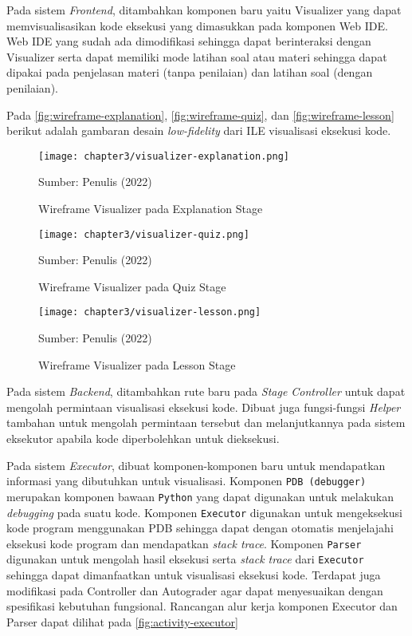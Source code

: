 Pada sistem \textit{Frontend}, ditambahkan komponen baru yaitu Visualizer yang dapat memvisualisasikan kode eksekusi yang dimasukkan pada komponen Web IDE. Web IDE yang sudah ada dimodifikasi sehingga dapat berinteraksi dengan Visualizer serta dapat memiliki mode latihan soal atau materi sehingga dapat dipakai pada penjelasan materi (tanpa penilaian) dan latihan soal (dengan penilaian).

Pada \autoref{fig:wireframe-explanation}, \autoref{fig:wireframe-quiz}, dan \autoref{fig:wireframe-lesson} berikut adalah gambaran desain \textit{low-fidelity} dari ILE visualisasi eksekusi kode.

\begin{figure}[H]
  \centering
  \texttt{[image: chapter3/visualizer-explanation.png]}
  \caption{Wireframe Visualizer pada Explanation Stage} \label{fig:wireframe-explanation}
  Sumber: Penulis (2022)
\end{figure}

\begin{figure}[H]
  \centering
  \texttt{[image: chapter3/visualizer-quiz.png]}
  \caption{Wireframe Visualizer pada Quiz Stage} \label{fig:wireframe-quiz}
  Sumber: Penulis (2022)
\end{figure}

\begin{figure}[H]
  \centering
  \texttt{[image: chapter3/visualizer-lesson.png]}
  \caption{Wireframe Visualizer pada Lesson Stage} \label{fig:wireframe-lesson}
  Sumber: Penulis (2022)
\end{figure}

Pada sistem \textit{Backend}, ditambahkan rute baru pada \textit{Stage Controller} untuk dapat mengolah permintaan visualisasi eksekusi kode. Dibuat juga fungsi-fungsi \textit{Helper} tambahan untuk mengolah permintaan tersebut dan melanjutkannya pada sistem eksekutor apabila kode diperbolehkan untuk dieksekusi.

Pada sistem \textit{Executor}, dibuat komponen-komponen baru untuk mendapatkan informasi yang dibutuhkan untuk visualisasi. Komponen \verb|PDB (debugger)| merupakan komponen bawaan \verb|Python| yang dapat digunakan untuk melakukan \textit{debugging} pada suatu kode. Komponen \verb|Executor| digunakan untuk mengeksekusi kode program menggunakan PDB sehingga dapat dengan otomatis menjelajahi eksekusi kode program dan mendapatkan \textit{stack trace}. Komponen \verb|Parser| digunakan untuk mengolah hasil eksekusi serta \textit{stack trace} dari \verb|Executor| sehingga dapat dimanfaatkan untuk visualisasi eksekusi kode. Terdapat juga modifikasi pada Controller dan Autograder agar dapat menyesuaikan dengan spesifikasi kebutuhan fungsional. Rancangan alur kerja komponen Executor dan Parser dapat dilihat pada \autoref{fig:activity-executor}

